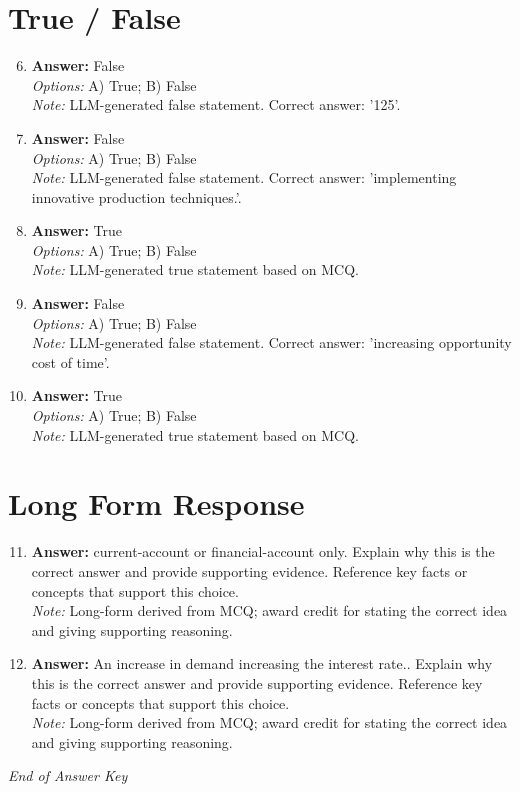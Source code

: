 \documentclass[12pt]{article}
\begin{document}
\section*{True / False}
\begin{enumerate}[label=\arabic*.]
\setcounter{enumi}{5}
\item \textbf{Answer:} False
\\ \textit{Options:} A) True; B) False
\\ \textit{Note:} LLM-generated false statement. Correct answer: '125'.
\item \textbf{Answer:} False
\\ \textit{Options:} A) True; B) False
\\ \textit{Note:} LLM-generated false statement. Correct answer: 'implementing innovative production techniques.'.
\item \textbf{Answer:} True
\\ \textit{Options:} A) True; B) False
\\ \textit{Note:} LLM-generated true statement based on MCQ.
\item \textbf{Answer:} False
\\ \textit{Options:} A) True; B) False
\\ \textit{Note:} LLM-generated false statement. Correct answer: 'increasing opportunity cost of time'.
\item \textbf{Answer:} True
\\ \textit{Options:} A) True; B) False
\\ \textit{Note:} LLM-generated true statement based on MCQ.
\end{enumerate}

\section*{Long Form Response}
\begin{enumerate}[label=\arabic*.]
\setcounter{enumi}{10}
\item \textbf{Answer:} current-account or financial-account only. Explain why this is the correct answer and provide supporting evidence. Reference key facts or concepts that support this choice.
\\ \textit{Note:} Long-form derived from MCQ; award credit for stating the correct idea and giving supporting reasoning.
\item \textbf{Answer:} An increase in demand increasing the interest rate.. Explain why this is the correct answer and provide supporting evidence. Reference key facts or concepts that support this choice.
\\ \textit{Note:} Long-form derived from MCQ; award credit for stating the correct idea and giving supporting reasoning.
\end{enumerate}

\vfill
\noindent\textit{End of Answer Key}
\end{document}
